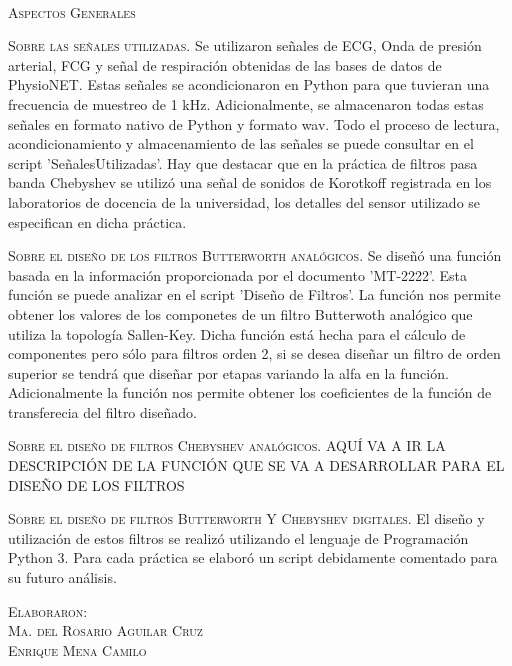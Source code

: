 \documentclass[10pt,letterpaper,spanish,twoside]{report}
\begin{document}

\textsc{}

\begin{center}
 \textsc{\asignatura}
 \textsc{\\Aspectos Generales}
\end{center}

\textsc{Sobre las señales utilizadas.} Se utilizaron señales de ECG, Onda de presión arterial, FCG y señal de respiración obtenidas de las bases de datos de PhysioNET. Estas señales se acondicionaron en Python para que tuvieran una frecuencia de muestreo de 1 kHz. Adicionalmente, se almacenaron todas estas señales en formato nativo de Python y formato wav. Todo el proceso de lectura, acondicionamiento y almacenamiento de las señales se puede consultar en el script 'SeñalesUtilizadas'. Hay que destacar que en la práctica de filtros pasa banda Chebyshev se utilizó una señal de sonidos de Korotkoff registrada en los laboratorios de docencia de la universidad, los detalles del sensor utilizado se especifican en dicha práctica.

\textsc{Sobre el diseño de los filtros Butterworth analógicos.} Se diseñó una función basada en la información proporcionada por el documento 'MT-2222'. Esta función se puede analizar en el script 'Diseño de Filtros'. La función nos permite obtener los valores de los componetes de un filtro Butterwoth analógico que utiliza la topología Sallen-Key. Dicha función está hecha para el cálculo de componentes pero sólo para filtros orden 2, si se desea diseñar un filtro de orden superior se tendrá que diseñar por etapas variando la alfa en la función. Adicionalmente la función nos permite obtener los coeficientes de la función de transferecia del filtro diseñado.

\textsc{Sobre el diseño de filtros Chebyshev analógicos.} AQUÍ VA A IR LA DESCRIPCIÓN DE LA FUNCIÓN QUE SE VA A DESARROLLAR PARA EL DISEÑO DE LOS FILTROS

\textsc{Sobre el diseño de filtros Butterworth Y Chebyshev digitales.} El diseño y utilización de estos filtros se realizó utilizando el lenguaje de Programación Python 3. Para cada práctica se elaboró un script debidamente comentado para su futuro análisis.


\vfill
\begin{flushright}
\textsc{Elaboraron:\\
Ma. del Rosario Aguilar Cruz\\
Enrique Mena Camilo}
\end{flushright}
\end{document}

